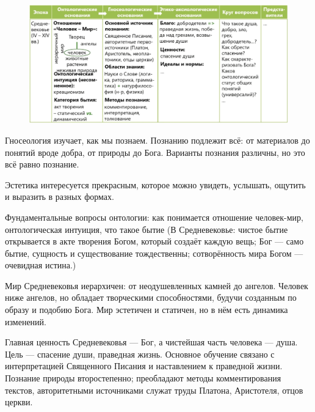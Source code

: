 
\begin{figure}[H]
    \centering
    \includegraphics[width=0.8\linewidth]{pictures/med.png}
    \label{medieval}
\end{figure}

Гносеология изучает, как мы познаем. Познанию подлежит всё: от материалов до понятий вроде добра, от природы до Бога. Варианты познания различны, но это всё равно познание.

Эстетика интересуется прекрасным, которое можно увидеть, услышать, ощутить и выразить в разных формах.

Фундаментальные вопросы онтологии: как понимается отношение человек-мир, онтологическая интуиция, что такое бытие (В Средневековье: чистое бытие открывается в акте творения Богом, который создаёт каждую вещь; Бог — само бытие, сущность и существование тождественны; сотворённость мира Богом — очевидная истина.)

Мир Средневековья иерархичен: от неодушевленных камней до ангелов. Человек ниже ангелов, но обладает творческими способностями, будучи созданным по образу и подобию Бога. Мир эстетичен и статичен, но в нём есть динамика изменений.

Главная ценность Средневековья — Бог, а чистейшая часть человека — душа. Цель — спасение души, праведная жизнь. Основное обучение связано с интерпретацией Священного Писания и наставлением к праведной жизни. Познание природы второстепенно; преобладают методы комментирования текстов, авторитетными источниками служат труды Платона, Аристотеля, отцов церкви.

